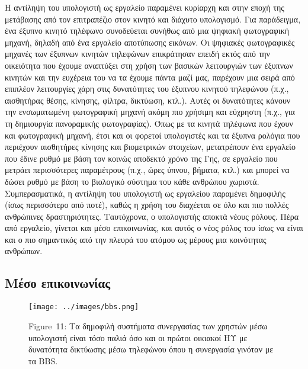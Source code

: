 \documentclass[
]{article}
\begin{document}
Η αντίληψη του υπολογιστή ως εργαλείο παραμένει κυρίαρχη και στην εποχή
της μετάβασης από τον επιτραπέζιο στον κινητό και διάχυτο υπολογισμό.
Για παράδειγμα, ένα έξυπνο κινητό τηλέφωνο συνοδεύεται συνήθως από μια
ψηφιακή φωτογραφική μηχανή, δηλαδή από ένα εργαλείο αποτύπωσης εικόνων.
Οι ψηφιακές φωτογραφικές μηχανές των έξυπνων κινητών τηλεφώνων
επικράτησαν επειδή εκτός από την οικειότητα που έχουμε αναπτύξει στη
χρήση των βασικών λειτουργιών των έξυπνων κινητών και την ευχέρεια του
να τα έχουμε πάντα μαζί μας, παρέχουν μια σειρά από επιπλέον λειτουργίες
χάρη στις δυνατότητες του έξυπνου κινητού τηλεφώνου (π.χ., αισθητήρας
θέσης, κίνησης, φίλτρα, δικτύωση, κτλ.). Αυτές οι δυνατότητες κάνουν την
ενσωματωμένη φωτογραφική μηχανή ακόμη πιο χρήσιμη και εύχρηστη (π.χ.,
για τη δημιουργία πανοραμικής φωτογραφίας). Όπως με τα κινητά τηλέφωνα
που έχουν και φωτογραφική μηχανή, έτσι και οι φορετοί υπολογιστές και τα
έξυπνα ρολόγια που περιέχουν αισθητήρες κίνησης και βιομετρικών
στοιχείων, μετατρέπουν ένα εργαλείο που έδινε ρυθμό με βάση τον κοινώς
αποδεκτό χρόνο της Γης, σε εργαλείο που μετράει περισσότερες παραμέτρους
(π.χ., ώρες ύπνου, βήματα, κτλ.) και μπορεί να δώσει ρυθμό με βάση το
βιολογικό σύστημα του κάθε ανθρώπου χωριστά. Συμπερασματικά, η αντίληψη
του υπολογιστή ως εργαλείου παραμένει δημοφιλής (ίσως περισσότερο από
ποτέ), καθώς η χρήση του διαχέεται σε όλο και πιο πολλές ανθρώπινες
δραστηριότητες. Ταυτόχρονα, ο υπολογιστής αποκτά νέους ρόλους. Πέρα από
εργαλείο, γίνεται και μέσο επικοινωνίας, και αυτός ο νέος ρόλος του ίσως
να είναι και ο πιο σημαντικός από την πλευρά του ατόμου ως μέρους μια
κοινότητας ανθρώπων.

\hypertarget{ux3bcux3adux3c3ux3bf-ux3b5ux3c0ux3b9ux3baux3bfux3b9ux3bdux3c9ux3bdux3afux3b1ux3c2}{%
\subsection{Μέσο
επικοινωνίας}\label{ux3bcux3adux3c3ux3bf-ux3b5ux3c0ux3b9ux3baux3bfux3b9ux3bdux3c9ux3bdux3afux3b1ux3c2}}

\leavevmode{}%
\begin{figure}
\hypertarget{fig:bbs}{%
\centering
\texttt{[image: ../images/bbs.png]}
\caption{Figure~11: Τα δημοφιλή συστήματα συνεργασίας των χρηστών μέσω
υπολογιστή είναι τόσο παλιά όσο και οι πρώτοι οικιακοί ΗΥ με δυνατότητα
δικτύωσης μέσω τηλεφώνου όπου η συνεργασία γινόταν με τα
BBS.}\label{fig:bbs}
}
\end{figure}
\end{document}
